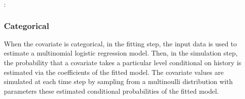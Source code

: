 \documentclass[letterpaper,10pt,english]{sphinxmanual}
\begin{document}
\begin{sphinxVerbatim}[commandchars=\\\{\}]
        
               
            \PYG{p}{[} \PYG{p}{]}
            \PYG{p}{[} \PYG{p}{]}
           
           
            
\end{sphinxVerbatim}

\sphinxAtStartPar
{}:
\begin{quote}

\end{quote}


\subsubsection{Categorical}
\label{\detokenize{Specifications/Covariate models:categorical}}
\sphinxAtStartPar
When the covariate is categorical, in the fitting step, the input data is used to estimate
a multinomial logistic regression model. Then, in the simulation step, the probability that a covariate
takes a particular level conditional on history is estimated via the coefficients of
the fitted model. The covariate values are simulated at each time step by sampling from a multinoulli distribution with parameters these estimated
conditional probabilities of the fitted model.
\end{document}
